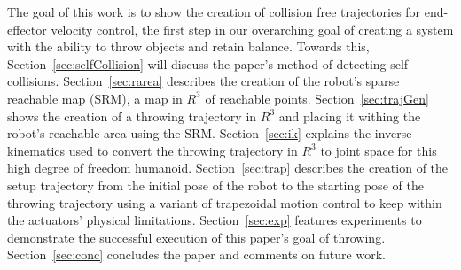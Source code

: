 
The goal of this work is to show the creation of collision free trajectories for end-effector velocity control, the first step in our overarching goal of creating a system with the ability to throw objects and retain balance.  Towards this, Section~\ref{sec:selfCollision} will discuss the paper's method of detecting self collisions.  Section~\ref{sec:rarea} describes the creation of the robot's sparse reachable map (SRM), a map in $R^3$ of reachable points.  Section~\ref{sec:trajGen} shows the creation of a throwing trajectory in $R^3$ and placing it withing the robot's reachable area using the SRM.  Section~\ref{sec:ik} explains the inverse kinematics used to convert the throwing trajectory in $R^3$ to joint space for this high degree of freedom humanoid.  Section~\ref{sec:trap} describes the creation of the setup trajectory from the initial pose of the robot to the starting pose of the throwing trajectory using a variant of trapezoidal motion control to keep within the actuators' physical limitations.  Section~\ref{sec:exp} features experiments to demonstrate the successful execution of this paper's goal of throwing.  Section~\ref{sec:conc} concludes the paper and comments on future work.

